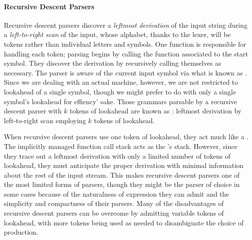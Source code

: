 \paragraph{Recursive Descent Parsers}
Recursive descent parsers discover a \emph{leftmost derivation} of the input string during a \emph{left-to-right scan} of the input, whose alphabet, thanks to the lexer, will be tokens rather than individual letters and symbols. One function is responsible for handling each token; parsing begins by calling the function associated to the start symbol. They discover the derivation by recursively calling themselves as necessary. The parser is aware of the current input symbol via what is known as . Since we are dealing with an actual machine, however, we are not restricted to lookahead of a single symbol, though we might prefer to do with only a single symbol's lookahead for effiency' sake. Those grammars parsable by a recursive descent parser with $k$ tokens of lookahead are known as : leftmost derivation by left-to-right scan employing $k$ tokens of lookahead.

When recursive descent parsers use one token of lookahead, they act much like a \PDA. The implicitly managed function call stack acts as the \PDA's stack. However, since they trace out a leftmost derivation with only a limited number of tokens of lookahead, they must anticipate the proper derivation with minimal information about the rest of the input stream. This makes recursive descent parsers one of the most limited forms of parsers, though they might be the parser of choice in some cases because of the naturalness of expression they can admit and the simplicity and compactness of their parsers. Many of the disadvantages of recursive descent parsers can be overcome by admitting variable tokens of lookahead, with more tokens being used as needed to disambiguate the choice of production. 

